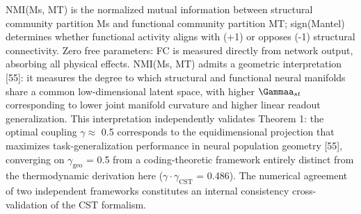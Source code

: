 \documentclass[a4paper,12pt]{article}
\begin{document}
NMI(Ms, MT) is the normalized mutual information between structural community partition Ms and functional community partition MT; sign(Mantel) determines whether functional activity aligns with (+1) or opposes (-1) structural connectivity.
Zero free parameters: FC is measured directly from network output, absorbing all physical effects.
NMI(Ms, MT) admits a geometric interpretation [55]: it measures the degree to which structural and functional neural manifolds share a common low-dimensional latent space, with higher $\Gammaa_{st}$ corresponding to lower joint manifold curvature and higher linear readout generalization.
This interpretation independently validates Theorem 1: the optimal coupling $\gamma \approx$ 0.5 corresponds to the equidimensional projection that maximizes task-generalization performance in neural population geometry [55], converging on $\gamma_{\text{geo}}$ = 0.5 from a coding-theoretic framework entirely distinct from the thermodynamic derivation here ($\gamma \cdot \gamma_{\text{CST}}$ = 0.486).
The numerical agreement of two independent frameworks constitutes an internal consistency cross-validation of the CST formalism.
\end{document}
